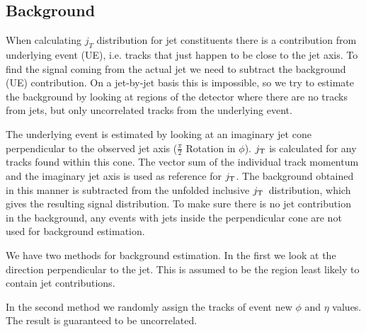  
 \subsection{Background}
\label{sec:bg}
When calculating $j_T$ distribution for jet constituents there is a contribution from underlying event (UE), i.e. tracks that just happen to be close to the jet axis. To find the signal coming from the actual jet we need to subtract the background (UE) contribution. On a jet-by-jet basis this is impossible, so we try to estimate the background by looking at regions of the detector where there are no tracks from jets, but only uncorrelated tracks from the underlying event.
 
The underlying event is estimated by looking at an imaginary jet cone perpendicular to the observed jet axis ($\frac{\pi}{2}$ Rotation in $\phi$). $j_{\rm T}$ is calculated for any tracks found within this cone. The vector sum of the individual track momentum and the imaginary jet axis is used as reference for $j_{\rm T}$. The background obtained in this manner is subtracted from the unfolded inclusive $j_{\rm T}$ distribution, which gives the resulting signal distribution. To make sure there is no jet contribution in the background, any events with jets inside the perpendicular cone are not used for background estimation.



We have two methods for background estimation. In the first we look at the direction perpendicular to the jet. This is assumed to be the region least likely to contain jet contributions.

In the second method we randomly assign the tracks of event new $\phi$ and $\eta$ values. The result is guaranteed to be uncorrelated.

